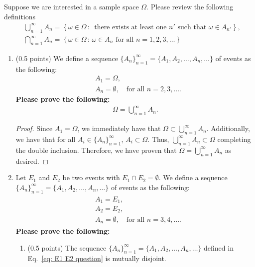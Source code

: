 \documentclass[11pt]{article}
\begin{document}
Suppose we are interested in a sample space $\Omega$. Please review the following definitions
\begin{align*}
& \bigcup_{n=1}^\infty A_n=\left\{\omega\in\Omega \,:\, \mbox{ there exists at least one }n'\mbox{ such that }\omega\in A_{n'}\right\}, \\
& \bigcap_{n=1}^\infty A_n=\left\{\omega\in\Omega \,:\, \omega\in A_n \mbox{ for all }n=1,2,3,\ldots\right\}
\end{align*}
\begin{enumerate}
\item (0.5 points) We define a sequence $\{A_n\}_{n=1}^\infty=\{A_1, A_2,\ldots,A_n,\ldots\}$ of events as the following: 
\begin{align*}
& A_1=\Omega,\\
& A_n=\emptyset,\ \ \ \mbox{ for all }n=2,3,\ldots.
\end{align*}
\textbf{Please prove the following:}
\begin{align}\label{eq: infinite union example}
\Omega=\bigcup_{n=1}^\infty A_n.
\end{align}

\begin{proof}
  Since \(A_1=\Omega\), we immediately have that \(\Omega\subset \bigcup_{n=1}^\infty A_n\). Additionally,
  we have that for all \(A_i\in \{A_n\}^{\infty}_{n=1}\), \(A_i\subset\Omega\). Thus, \(\bigcup_{n=1}^\infty A_n\subset\Omega\)
  completing the double inclusion. Therefore, we have proven that \(\Omega = \bigcup_{n=1}^\infty A_n\) as desired.
\end{proof}

\item Let $E_1$ and $E_2$ be two events with $E_1\cap E_2=\emptyset$. We define a sequence $\{A_n\}_{n=1}^\infty=\{A_1, A_2,\ldots,A_n,\ldots\}$ of events as the following: 
\begin{align}\label{eq: E1 E2 question}
\begin{aligned}
& A_1=E_1,\\
& A_2=E_2,\\
& A_n=\emptyset,\ \ \ \mbox{ for all }n=3,4,\ldots.
\end{aligned}
\end{align}
\textbf{Please prove the following:}
\begin{enumerate}
\item (0.5 points) The sequence $\{A_n\}_{n=1}^\infty=\{A_1, A_2,\ldots,A_n,\ldots\}$ defined in Eq.~\eqref{eq: E1 E2 question} is mutually disjoint.


\end{enumerate}
\end{enumerate}
\end{document}
